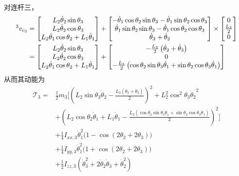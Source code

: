 \documentclass{ctexart}
\begin{document}
对连杆三，
\[
    \begin{aligned}
        \prescript{3}{}{v_{c_3}} & = \begin{bmatrix}
            {L_2} \dot\theta_2 \sin\theta_3\\
                {L_2} \dot\theta_2 \cos\theta_3\\
                {L_2} \dot\theta_1 \cos\theta_2 + L_1 \dot \theta_1
        \end{bmatrix} + \begin{bmatrix}
            -\dot\theta_1 \cos\theta_2 \sin\theta_3 -\dot\theta_1 \sin\theta_2 \cos\theta_3\\
            \dot\theta_1 \sin\theta_2 \sin\theta_3 - \dot\theta_1 \cos\theta_2 \cos\theta_3\\
            \dot\theta_3 + \dot\theta_2
        \end{bmatrix} \times \begin{bmatrix}
            0 \\ \frac{L_3}{2} \\ 0 \\
        \end{bmatrix} \\
        & = \begin{bmatrix}
            {L_2} \dot\theta_2 \sin\theta_3\\
                {L_2} \dot\theta_2 \cos\theta_3\\
                {L_2} \dot\theta_1 \cos\theta_2 + L_1 \dot \theta_1
        \end{bmatrix} + \begin{bmatrix}
            - \frac{L_3}{2} \left( \dot \theta_2 + \dot \theta_3\right) \\
            0 \\
            - \frac{{L_3}}{2}  \left( \cos\theta_2 \sin\theta_3 \dot\theta_1 + \sin\theta_2 \cos\theta_3 \dot\theta_1 \right) 
        \end{bmatrix}
    \end{aligned}
\]
从而其动能为
\[
    \begin{aligned}
        \mathcal T_3 = & \frac{1}{2} m_3 \Big[ {{\left( {L_2} \sin\theta_3 \dot\theta_2-\frac{{L_3} \left( \dot\theta_3+\dot\theta_2\right) }{2}\right) }^{2}}+ L_2^2 {{\cos^2\theta_3}} {{\dot\theta_2}^{2}} \\ 
        &+ {{\left( {L_2} \cos\theta_2 \dot\theta_1 + L_1 \dot \theta_1 -\frac{{L_3} \left( \cos\theta_2 \sin\theta_3 \dot\theta_1+\sin\theta_2 \cos\theta_3 \dot\theta_1\right) }{2}\right) }^{2}} \Big] \\
        &+ \frac{1}{4} I_{xx,3} \dot\theta_1^2 \big( 1 - \cos(2\theta_2 + 2\theta_3) \big) \\
        &+ \frac{1}{4} I_{yy,3} \dot\theta_1^2 \big( 1 + \cos(2\theta_2 + 2\theta_3) \big) \\
        &+ \frac{1}{2} I_{zz,3} (\dot\theta_3^2 + 2 \dot\theta_2 \dot\theta_3 + \dot\theta_2^2)
    \end{aligned}
\]
\end{document}

